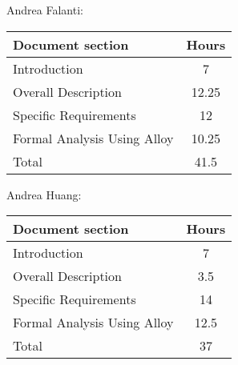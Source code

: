 Andrea Falanti:

\begin{tabular}{|l|c|}
    \hline
    Document section & Hours \\
    \hline
     Introduction & 7\\
     Overall Description & 12.25\\
     Specific Requirements & 12\\
     Formal Analysis Using Alloy & 10.25\\
     \hline
     Total & 41.5\\
     \hline
\end{tabular}
\vskip 0.3in

Andrea Huang:

\begin{tabular}{|l|c|}
    \hline
    Document section & Hours \\
    \hline
     Introduction &  7\\
     Overall Description & 3.5\\
     Specific Requirements & 14\\
     Formal Analysis Using Alloy & 12.5\\
     \hline
     Total & 37\\
     \hline
\end{tabular}